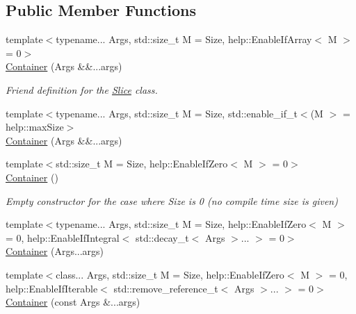 \subsection*{Public Member Functions}
\begin{DoxyCompactItemize}
\item 
{\footnotesize template$<$typename... Args, std\+::size\+\_\+t M = Size, help\+::\+Enable\+If\+Array$<$ M $>$  = 0$>$ }\\\hyperlink{classcnt_1_1help_1_1Container_aed351dd256e42cc3c4976cf8fba1ccc4}{Container} (Args \&\&...args)
\begin{DoxyCompactList}\small\item\em Friend definition for the \textquotesingle{}\hyperlink{classcnt_1_1help_1_1Slice}{Slice}\textquotesingle{} class. \end{DoxyCompactList}\item 
{\footnotesize template$<$typename... Args, std\+::size\+\_\+t M = Size, std\+::enable\+\_\+if\+\_\+t$<$(\+M $>$  = help\+::max\+Size$>$ }\\\hyperlink{classcnt_1_1help_1_1Container_aed351dd256e42cc3c4976cf8fba1ccc4}{Container} (Args \&\&...args)
\item 
{\footnotesize template$<$std\+::size\+\_\+t M = Size, help\+::\+Enable\+If\+Zero$<$ M $>$  = 0$>$ }\\\hyperlink{classcnt_1_1help_1_1Container_a6f9ad3c670794e4e87a53f7bfe5557bb}{Container} ()
\begin{DoxyCompactList}\small\item\em Empty constructor for the case where \textquotesingle{}Size\textquotesingle{} is 0 (no compile time size is given) \end{DoxyCompactList}\item 
{\footnotesize template$<$typename... Args, std\+::size\+\_\+t M = Size, help\+::\+Enable\+If\+Zero$<$ M $>$  = 0, help\+::\+Enable\+If\+Integral$<$ std\+::decay\+\_\+t$<$ Args $>$... $>$  = 0$>$ }\\\hyperlink{classcnt_1_1help_1_1Container_a71204ac9d606898107ab40c90ff6632d}{Container} (Args...\+args)
\item 
{\footnotesize template$<$class... Args, std\+::size\+\_\+t M = Size, help\+::\+Enable\+If\+Zero$<$ M $>$  = 0, help\+::\+Enable\+If\+Iterable$<$ std\+::remove\+\_\+reference\+\_\+t$<$ Args $>$... $>$  = 0$>$ }\\\hyperlink{classcnt_1_1help_1_1Container_aa199ac743a8e601ca03a594f2da3d04d}{Container} (const Args \&...args)
\item 

\end{DoxyCompactItemize}
